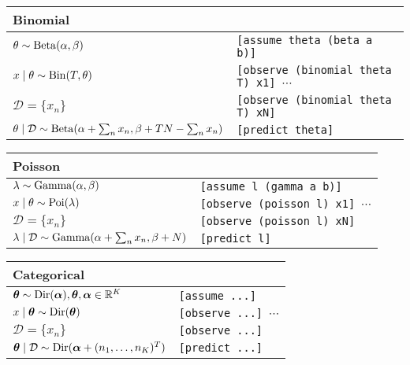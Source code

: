 \begin{table}[ht!]
\begin{tabular}{ll}
\toprule
Binomial & \\
\midrule
$\theta \sim \operatorname{Beta}(\alpha, \beta)$													& \texttt{[assume theta (beta a b)]} \\
$x \mid \theta \sim \operatorname{Bin}(T, \theta)$												& \texttt{[observe (binomial theta T) x1] $\cdots$} \\
$\mathcal D = \{x_n\}$																& \texttt{[observe (binomial theta T) xN]} \\
$\theta \mid \mathcal D \sim \operatorname{Beta}(\alpha + \sum_n x_n, \beta + TN - \sum_n x_n)$	& \texttt{[predict theta]} \\
\bottomrule
\end{tabular}
\end{table}

\begin{table}[ht!]
\begin{tabular}{ll}
\toprule
Poisson & \\
\midrule
$\lambda \sim \operatorname{Gamma}(\alpha, \beta)$											& \texttt{[assume l (gamma a b)]} \\
$x \mid \theta \sim \operatorname{Poi}(\lambda)$													& \texttt{[observe (poisson l) x1] $\cdots$} \\
$\mathcal D = \{x_n\}$																& \texttt{[observe (poisson l) xN]} \\
$\lambda \mid \mathcal D \sim \operatorname{Gamma}(\alpha + \sum_n x_n, \beta + N)$			& \texttt{[predict l]} \\
\bottomrule
\end{tabular}
\end{table}

\begin{table}[ht!]
\begin{tabular}{ll}
\toprule
Categorical & \\
\midrule
$\boldsymbol{\mathbf{\theta}} \sim \operatorname{Dir}(\boldsymbol{\mathbf{\alpha}}), \boldsymbol{\mathbf{\theta}},\boldsymbol{\mathbf{\alpha}} \in \mathbb R^K$			& \texttt{[assume ...]} \\
$x \mid \boldsymbol{\mathbf{\theta}} \sim \operatorname{Dir}(\boldsymbol{\mathbf{\theta}})$											& \texttt{[observe ...] $\cdots$} \\
$\mathcal D = \{x_n\}$																& \texttt{[observe ...]} \\
$\boldsymbol{\mathbf{\theta}} \mid \mathcal D \sim \operatorname{Dir}(\boldsymbol{\mathbf{\alpha}} + (n_1, \dotsc, n_K)^T)$			& \texttt{[predict ...]} \\
\bottomrule
\end{tabular}
\end{table}

